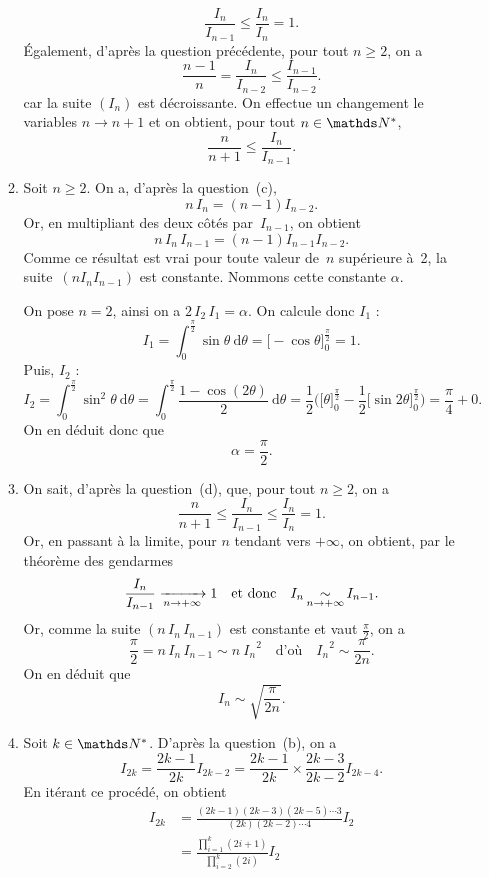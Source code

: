 \documentclass[a4paper]{article}
\begin{document}
\begin{enumerate}
\begin{enumerate}
\[						\boxed{\frac{I_n}{I_{n-1}} \le \frac{I_n}{I_n} = 1}
					.\]
					Également, d'après la question précédente, pour tout $n \ge 2$, on a \[
						\frac{n-1}{n} = \frac{I_n}{I_{n-2}} \le \frac{I_{n-1}}{I_{n-2}}
					.\] car la suite $(I_n)$\/ est décroissante. On effectue un changement le variables $n\to n+1$\/ et on obtient, pour tout $n \in \N^*$, \[
						\boxed{\frac{n}{n+1} \le \frac{I_n}{I_{n-1}}.}
					\]
				\item Soit $n \ge 2$. On a, d'après la question~(c), \[
						n\,I_n = (n-1)I_{n-2}
					.\] Or, en multipliant des deux côtés par~$I_{n-1}$, on obtient \[
						n\,I_n\,I_{n-1} = (n-1)I_{n-1}I_{n-2}
					.\] Comme ce résultat est vrai pour toute valeur de~$n$\/ supérieure à~2, la suite~$(n I_n I_{n-1})$\/ est constante. Nommons cette constante $\alpha$.

					On pose $n = 2$, ainsi on a $2\,I_2\,I_1 = \alpha$.
					On calcule donc $I_1$\/ : \[
						I_1 = \int_{0}^{\frac{\pi}{2}} \sin \theta ~\mathrm{d}\theta = \big[-\cos\theta\big]_0^{\frac{\pi}{2}} = 1
					.\] Puis, $I_2$\/ : \[
						I_2 = \int_{0}^{\frac{\pi}{2}} \sin^2\theta~\mathrm{d}\theta = \int_{0}^{\frac{\pi}{2}} \frac{1 - \cos(2\theta)}{2}~\mathrm{d}\theta = \frac{1}{2} \bigg(\big[\theta\big]_0^{\frac{\pi}{2}} - \frac{1}{2} \big[\sin 2\theta\big]_0^{\frac{\pi}{2}}\bigg) = \frac{\pi}{4} + 0
					.\]
					On en déduit donc que \[
						\boxed{\alpha = \frac{\pi}{2}.}
					\]
				\item On sait, d'après la question~(d), que, pour tout $n \ge 2$, on a \[
						\frac{n}{n+1} \le \frac{I_n}{I_{n-1}} \le \frac{I_n}{I_n} = 1
					.\] Or, en passant à la limite, pour $n$\/ tendant vers $+\infty$, on obtient, par le théorème des gendarmes \[
						\frac{I_n}{I_{n-1}} \xrightarrow[n\to +\infty]{} 1 \quad \text{et donc} \quad I_n \operatorname*{\sim}_{n\to +\infty} I_{n-1}.
					\] Or, comme la suite $(n\,I_n\,I_{n-1})$\/ est constante et vaut $\frac{\pi}{2}$, on a \[
						\frac{\pi}{2} = n\,I_n\,I_{n-1} \sim n\:{I_n}^2
						\quad\text{d'où}\quad
						{I_n}^2 \sim \frac{\pi}{2n}.
					\]
					On en déduit que \[
						\boxed{I_n \sim \sqrt{\frac{\pi}{2n}}.}
					\]
				\item Soit $k \in \N^*$. D'après la question~(b), on a \[
						I_{2k} = \frac{2k-1}{2k} I_{2k-2} = \frac{2k-1}{2k} \times \frac{2k-3}{2k-2} I_{2k - 4}
					.\] En itérant ce procédé, on obtient
					\begin{align*}
						I_{2k} &= \frac{(2k-1)(2k-3)(2k-5)\cdots3}{(2k)(2k-2)\cdots4} I_2\\
						&= \frac{\prod_{i=1}^{k} (2i+1)}{\prod_{i=2}^k (2i)} I_2 \\

\end{align*}
\end{enumerate}
\end{enumerate}
\end{document}
